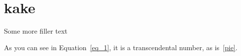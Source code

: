 \documentclass{cheatsheet}
\begin{document}
\section{kake}
\lipsum[1-1]
Some more filler text
\lipsum[2-2]
 
\maths[pie]{\huge\pi}

As you can see in Equation~\ref{eq_1}, it is a transcendental number, as is~\ref{pie}.

\lipsum[3-100]
\end{document}
